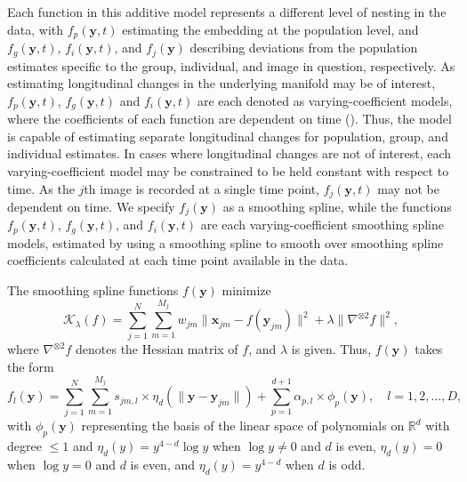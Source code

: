 \documentclass[11pt,reqno]{article}
\theoremstyle{definition}
\begin{document}
Each function in this additive model represents a different level of nesting in the data, with $f_p(\mathbf{y}, t)$ estimating the embedding at the population level, and $f_g(\mathbf{y}, t)$, $f_i(\mathbf{y}, t)$, and $f_{j}(\mathbf{y})$ describing deviations from the population estimates specific to the group, individual, and image in question, respectively. As estimating longitudinal changes in the underlying manifold may be of interest, $f_p(\mathbf{y}, t)$, $f_g(\mathbf{y}, t)$ and $f_i(\mathbf{y}, t)$ are each denoted as varying-coefficient models, where the coefficients of each function are dependent on time (\cite{hastieVaryingCoefficientModels1993}). Thus, the model is capable of estimating separate longitudinal changes for population, group, and individual estimates. In cases where longitudinal changes are not of interest, each varying-coefficient model may be constrained to be held constant with respect to time. As the $j$th image is recorded at a single time point, $f_{j}(\mathbf{y}, t)$ may not be dependent on time. We specify $f_{j}(\mathbf{y})$ as a smoothing spline, while the functions $f_p(\mathbf{y}, t)$, $f_g(\mathbf{y}, t)$, and $f_i(\mathbf{y}, t)$ are each varying-coefficient smoothing spline models, estimated by using a smoothing spline to smooth over smoothing spline coefficients calculated at each time point available in the data. 

The smoothing spline functions $f(\mathbf{y})$ minimize 
\[%
  \mathcal{K}_{\lambda}(f) = \sum_{j=1}^{N}\sum_{m=1}^{M_j}w_{jm}\|\mathbf{x}_{jm} - f(\mathbf{y}_{jm})\|^2 + \lambda\|\nabla^{\otimes 2}f\|^2
,\]%
where $\nabla^{\otimes 2}f$ denotes the Hessian matrix of $f$, and $\lambda$ is given. Thus, $f(\mathbf{y})$ takes the form
\begin{equation}
  f_l(\mathbf{y}) = \sum_{j=1}^{N}\sum_{m=1}^{M_j}s_{jm, l} \times \eta_{d}\left(\|\mathbf{y} - \mathbf{y}_{jm}\|\right) + \sum_{p = 1}^{d + 1}\alpha_{p, l} \times \phi_{p}(\mathbf{y}), \quad l = 1, 2, \dots, D, \label{eq:3}
\end{equation}
with $\phi_p(\mathbf{y})$ representing the basis of the linear space of polynomials on $\mathbb{R}^{d}$ with degree $\leq 1$ and $\eta_{d}(y) = y^{4-d}\log y$ when $\log y \neq 0$ and $d$ is even, $\eta_{d}(y) = 0$ when $\log y = 0$ and $d$ is even, and $\eta_{d}(y) = y^{4-d}$ when $d$ is odd. 
\end{document}
